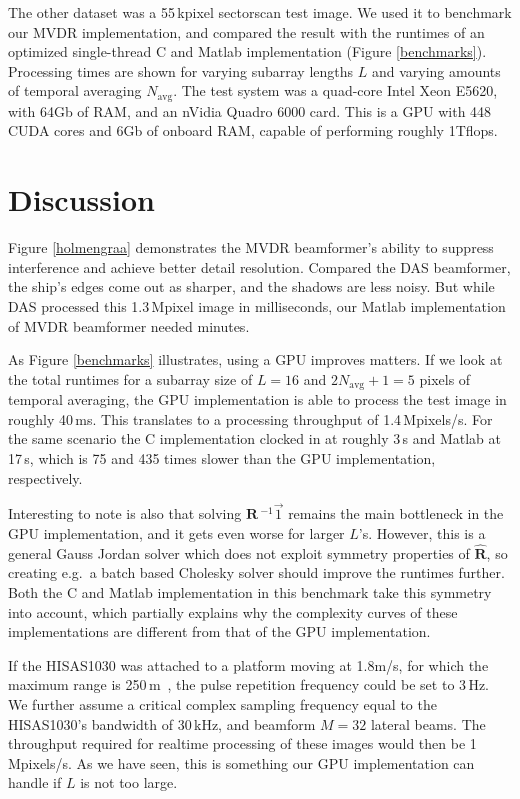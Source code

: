 \documentclass[12pt,journal,captionsoff,onecolumn]{IEEEtran}
\newcommand\Fig[1]{Figure \ref{#1}}
\newcommand\mat[1]{\boldsymbol{#1}}
\newcommand\1{\vec 1}
\newcommand*\eR{\mat{\hat R}}
\newcommand*\eRi{\hat{\mat R}\,\!^{-1}}
\begin{document}
The other dataset was a 55\,kpixel sectorscan test image. We used it to benchmark our \gls{MVDR} implementation, and compared the result with the runtimes of an optimized single-thread C and Matlab implementation (\Fig{benchmarks}). Processing times are shown for varying subarray lengths $L$ and varying amounts of temporal averaging $N_\text{avg}$. The test system was a quad-core Intel Xeon E5620, with 64Gb of \gls{RAM}, and an nVidia Quadro 6000 card. This is a \gls{GPU} with 448 \gls{CUDA} cores and 6Gb of onboard \gls{RAM}, capable of performing roughly 1Tflops.

\section{Discussion}

Figure \ref{holmengraa} demonstrates the \gls{MVDR} beamformer's ability to suppress interference and achieve better detail resolution. Compared the \gls{DAS} beamformer, the ship's edges come out as sharper, and the shadows are less noisy. But while \gls{DAS} processed this 1.3\,Mpixel image in milliseconds, our Matlab implementation of \gls{MVDR} beamformer needed minutes.

As Figure \ref{benchmarks} illustrates, using a \gls{GPU} improves matters. If we look at the total runtimes for a subarray size of $L=16$ and $2N_\text{avg}+1=5$ pixels of temporal averaging, the \gls{GPU} implementation is able to process the test image in roughly 40\,ms. This translates to a processing throughput of 1.4\,Mpixels/s. For the same scenario the C implementation clocked in at roughly 3\,s and Matlab at 17\,s, which is 75 and 435 times slower than the \gls{GPU} implementation, respectively.

\newpage
Interesting to note is also that solving $\eRi\1$ remains the main bottleneck in the \gls{GPU} implementation, and it gets even worse for larger $L$'s. However, this is a general Gauss Jordan solver which does not exploit symmetry properties of $\eR$, so creating e.g.\ a batch based Cholesky solver should improve the runtimes further. Both the C and Matlab implementation in this benchmark take this symmetry into account, which partially explains why the complexity curves of these implementations are different from that of the \gls{GPU} implementation.

If the HISAS1030 was attached to a platform moving at 1.8m/s, for which the maximum range is 250\,m~\cite{Hansen2010}, the pulse repetition frequency could be set to 3\,Hz. We further assume a critical complex sampling frequency equal to the HISAS1030's bandwidth of 30\,kHz, and beamform $M=32$ lateral beams. The throughput required for realtime processing of these images would then be 1\,Mpixels/s. As we have seen, this is something our \gls{GPU} implementation can handle if $L$ is not too large.%
\end{document}
